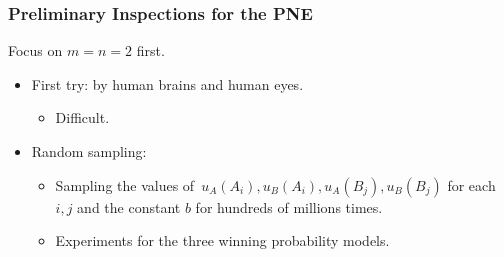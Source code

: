 \documentclass[xcolor=dvipsnames,envcountsect]{beamer}
\begin{document}
\begin{frame}
\frametitle{Preliminary Inspections for the PNE}
\quad Focus on $m=n=2$ first.
\vspace{8pt}
	\begin{itemize}
		\item First try: by human brains and human eyes. 
		\pause
		\begin{itemize}
			\item Difficult. \Frowny
		\end{itemize}
		\vspace{7pt}
		\pause
		\item Random sampling: \Smiley
		\begin{itemize}
			\item Sampling the values of~$u_A(A_i), u_B(A_i), u_A(B_j), u_B(B_j)$ for each $i, j$ and the constant $b$ for hundreds of millions times.
			\item Experiments for the three winning probability models.
		\end{itemize}
	\end{itemize}
\end{frame}
\end{document}

